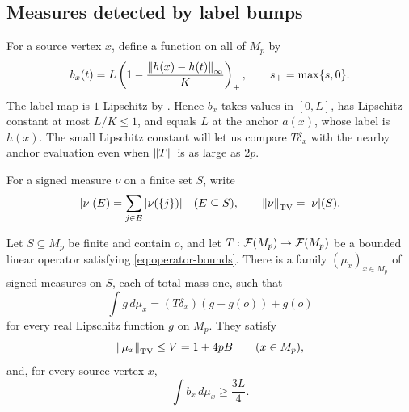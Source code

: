 \subsection{Measures detected by label bumps}

For a source vertex $x$, define a function on all of $M_p$ by
\begin{equation}\label{eq:bump}
 b_x(t)=L\left(1-\frac{\left\|h(x)-h(t)\right\|_\infty}{K}\right)_+,
 \qquad s_+=\max\{s,0\}.
\end{equation}
The label map is $1$-Lipschitz by . Hence $b_x$
takes values in $[0,L]$, has Lipschitz constant at most $L/K\le1$, and
equals $L$ at the anchor $a(x)$, whose label is $h(x)$. The small
Lipschitz constant will let us compare $T\delta_x$ with the nearby
anchor evaluation even when $\left\|T\right\|$ is as large as $2p$.

For a signed measure $\nu$ on a finite set $S$, write
\[
 |\nu|(E)=\sum_{j\in E}|\nu(\{j\})|\quad(E\subseteq S),
 \qquad \left\|\nu\right\|_{\mathrm{TV}}=|\nu|(S).
\]

\begin{lemma}\label{lem:measure-bounds}
Let $S\subseteq M_p$ be finite and contain $o$, and let
$T:\mathcal F(M_p)\to\mathcal F(M_p)$ be a bounded linear operator satisfying
\eqref{eq:operator-bounds}. There is a family $(\mu_x)_{x\in M_p}$ of
signed measures on $S$, each of total mass one, such that
\begin{equation}\label{eq:affine-pairing}
 \int g\,d\mu_x=(T\delta_x)(g-g(o))+g(o)
\end{equation}
for every real Lipschitz function $g$ on $M_p$. They satisfy
\begin{equation}\label{eq:tv-bound}
 \left\|\mu_x\right\|_{\mathrm{TV}}\le V=1+4pB\qquad(x\in M_p),
\end{equation}
and, for every source vertex $x$,
\begin{equation}\label{eq:bump-mass}
 \int b_x\,d\mu_x\ge\frac{3L}{4}.
\end{equation}
\end{lemma}

